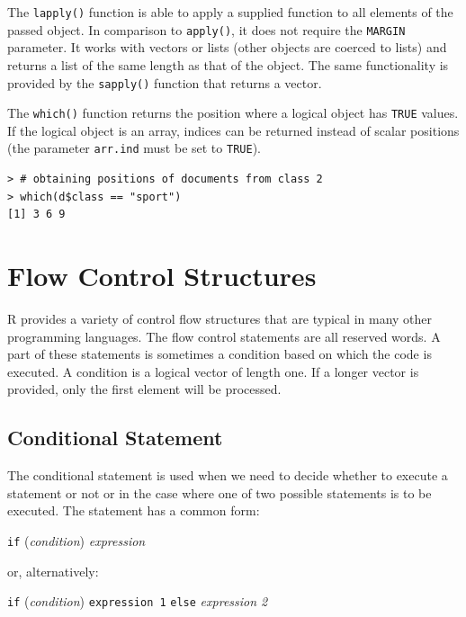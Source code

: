 The \texttt{lapply()} function is able to apply a supplied function to all elements of
the passed object. In comparison to \texttt{apply()}, it does not require the 
\texttt{MARGIN} parameter. It works with vectors or lists (other objects are coerced to 
lists) and returns a list of the same length as that of the object. The same 
functionality is provided by the \texttt{sapply()} function that returns a vector.

The \texttt{which()} function returns the position where a logical object has 
\texttt{TRUE} values. If the logical object is an array, indices can be returned 
instead of scalar positions (the parameter \texttt{arr.ind} must be set to \texttt{TRUE}).

\begin{verbatim}
> # obtaining positions of documents from class 2
> which(d$class == "sport")
[1] 3 6 9
\end{verbatim}

\section{Flow Control Structures}

R provides a variety of control flow structures that are typical in many other
programming languages. The flow control statements are all reserved words. A
part of these statements is sometimes a condition based on which the code is executed. A condition is a logical vector of length one. If a longer vector is provided,
only the first element will be processed.

\subsection{Conditional Statement}

The conditional statement is used when we need to decide whether to execute
a statement or not or in the case where one of two possible statements is to be
executed. The statement has a common form:

\begin{center}
    \texttt{if} (\textit{condition}) \textit{expression}
\end{center}

or, alternatively:

\begin{center}
    \texttt{if} (\textit{condition}) \texttt{expression 1} \texttt{else} \textit{expression 2}
\end{center}

